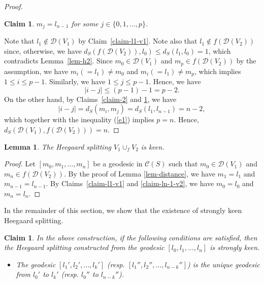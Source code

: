 \documentclass[]{aspm}
\newtheorem{lemma}[definition]{Lemma}
\newtheorem{claim}[definition]{Claim}
\begin{document}
\begin{proof}
\begin{claim}\label{claim-3}
$m_j=l_{n-1}$ for some $j\in\{0,1,\dots,p\}$.
\end{claim}


Note that $l_1\not\in \mathcal{D}(V_1)$ by Claim~\ref{claim-l1-v1}.
Note also that $l_1\not\in f(\mathcal{D}(V_2))$ since, otherwise, we have $d_S(f(\mathcal{D}(V_2)), l_0)\leq d_S(l_1,l_0)=1$, which contradicts Lemma~\ref{lem-h2}.
Since $m_0\in \mathcal{D}(V_1)$ and $m_p\in f(\mathcal{D}(V_2))$ by the assumption, we have $m_i(=l_1)\ne m_0$ and $m_i(=l_1)\ne m_p$, which implies $1\leq i\leq p-1$.
Similarly, we have $1\leq j\leq p-1$.
Hence, we have 
\begin{equation}\label{e1}
|i-j|\leq (p-1)-1=p-2.
\end{equation}
On the other hand, by Claims~\ref{claim-2} and \ref{claim-3}, we have 
$$
|i-j|=d_S(m_i,m_j)=d_S(l_1,l_{n-1})=n-2,
$$
which together with the inequality (\ref{e1}) implies $p=n$.
Hence, $d_{S} (\mathcal{D}(V_1), f(\mathcal{D}(V_2)))=n$.
\end{proof}




\begin{lemma}\label{lem-keen}
The Heegaard splitting $V_1\cup_f V_2$ is keen.
\end{lemma}

\begin{proof}
Let $[m_0,m_1,\dots,m_n]$ be a geodesic in $\mathcal{C}(S)$ such that $m_0\in \mathcal{D}(V_1)$ and $m_n\in f(\mathcal{D}(V_2))$.
By the proof of Lemma \ref{lem-distance}, we have $m_1=l_1$ and $m_{n-1}=l_{n-1}$.
By Claims~\ref{claim-l1-v1} and \ref{claim-ln-1-v2}, we have $m_0=l_0$ and $m_n=l_n$.
\end{proof}

In the remainder of this section, we show that the existence of strongly keen Heegaard splitting. 

\begin{claim}
In the above construction, if the following conditions are satisfied, then the Heegaard splitting constructed from the geodesic $[l_{0}, l_{1}, \dots, l_{n}]$ is strongly keen. 
\begin{itemize}
\item The geodesic $[l_1',l_2',\dots,l_k']$ (resp. $[l_1'',l_2'',\dots,l_{n-k}'']$) is the unique geodesic from $l_0'$ to $l_k'$ (resp. $l_0''$ to $l_{n-k}''$). 
\end{itemize}

\end{claim}
\end{document}
